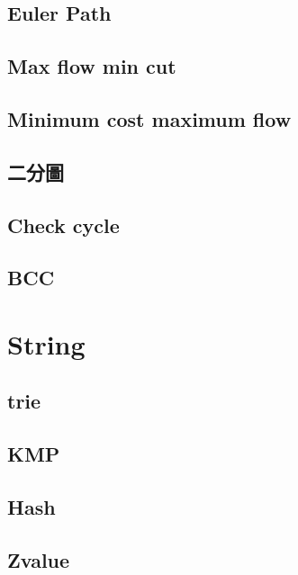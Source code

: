\subsection{Euler Path}

% 
\subsection{Max flow min cut} 

\subsection{Minimum cost maximum flow} 

\subsection{二分圖} 

\subsection{Check cycle} 

\subsection{BCC} 


\section{String}
\subsection{trie} 

\subsection{KMP} 

\subsection{Hash} 

\subsection{Zvalue} 

